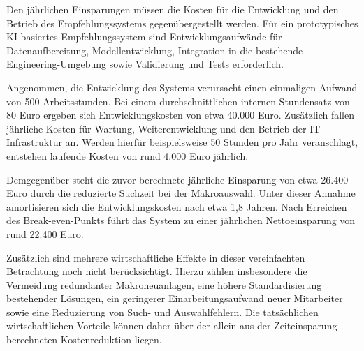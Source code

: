 Den jährlichen Einsparungen müssen die Kosten für die Entwicklung und den Betrieb des Empfehlungssystems gegenübergestellt werden. 
Für ein prototypisches KI-basiertes Empfehlungssystem sind Entwicklungsaufwände für Datenaufbereitung, Modellentwicklung, Integration in die bestehende Engineering-Umgebung sowie Validierung und Tests erforderlich.

Angenommen, die Entwicklung des Systems verursacht einen einmaligen Aufwand von 500 Arbeitsstunden. 
Bei einem durchschnittlichen internen Stundensatz von 80 Euro ergeben sich Entwicklungskosten von etwa 40.000 Euro. 
Zusätzlich fallen jährliche Kosten für Wartung, Weiterentwicklung und den Betrieb der IT-Infrastruktur an. 
Werden hierfür beispielsweise 50 Stunden pro Jahr veranschlagt, entstehen laufende Kosten von rund 4.000 Euro jährlich.

Demgegenüber steht die zuvor berechnete jährliche Einsparung von etwa 26.400 Euro durch die reduzierte Suchzeit bei der Makroauswahl. 
Unter dieser Annahme amortisieren sich die Entwicklungskosten nach etwa 1,8 Jahren. 
Nach Erreichen des Break-even-Punkts führt das System zu einer jährlichen Nettoeinsparung von rund 22.400 Euro.

Zusätzlich sind mehrere wirtschaftliche Effekte in dieser vereinfachten Betrachtung noch nicht berücksichtigt. 
Hierzu zählen insbesondere die Vermeidung redundanter Makroneuanlagen, eine höhere Standardisierung bestehender Lösungen, 
ein geringerer Einarbeitungsaufwand neuer Mitarbeiter sowie eine Reduzierung von Such- und Auswahlfehlern. 
Die tatsächlichen wirtschaftlichen Vorteile können daher über der allein aus der Zeiteinsparung berechneten Kostenreduktion liegen.


